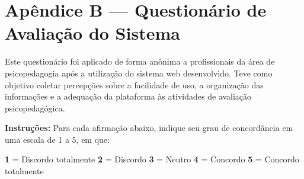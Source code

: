 \chapter*{Apêndice B — Questionário de Avaliação do Sistema}
\label{apendice:questionario}

Este questionário foi aplicado de forma anônima a profissionais da área de psicopedagogia após a utilização do sistema web desenvolvido. Teve como objetivo coletar percepções sobre a facilidade de uso, a organização das informações e a adequação da plataforma às atividades de avaliação psicopedagógica.

\bigskip
\textbf{Instruções:} Para cada afirmação abaixo, indique seu grau de concordância em uma escala de 1 a 5, em que:

\begin{center}
\textbf{1} = Discordo totalmente \quad \textbf{2} = Discordo \quad \textbf{3} = Neutro \quad \textbf{4} = Concordo \quad \textbf{5} = Concordo totalmente
\end{center}

\bigskip

